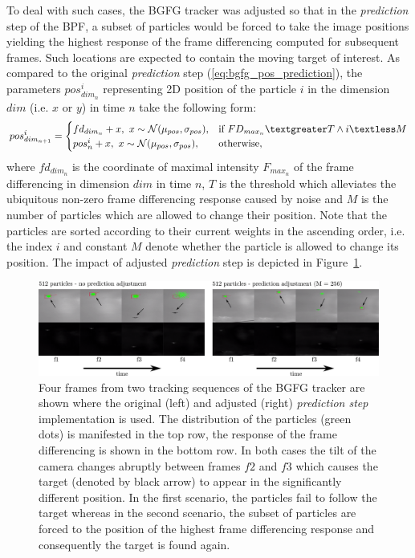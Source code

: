 To deal with such cases, the BGFG tracker was adjusted so that in the \textit{prediction} step of the BPF, a subset of particles would be forced to take the image positions yielding the highest response of the frame differencing computed for subsequent frames. Such locations are expected to contain the moving target of interest. As compared to the original \textit{prediction} step (\ref{eq:bgfg_pos_prediction}), the parameters $pos_{dim_{n}}^{i}$ representing 2D position of the particle $i$ in the dimension $dim$ (i.e. $x$ or $y$) in time $n$ take the following form:
\begin{align}
	pos_{dim_{n+1}}^{i} =
	\begin{cases}
		fd_{dim_{n}} + x, ~ x \sim \mathcal{N}(\mu_{pos}, \sigma_{pos}),  & \text{if}\ FD_{max_{n}} \textgreater T \land i \textless M \\
		pos_{n}^{i} + x, ~ x \sim \mathcal{N}(\mu_{pos}, \sigma_{pos}), & \text{otherwise},
	\end{cases}
\end{align}
where $fd_{dim_{n}}$ is the coordinate of maximal intensity $F_{max_{n}}$ of the frame differencing in dimension $dim$ in time $n$, $T$ is the threshold which alleviates the ubiquitous non-zero frame differencing response caused by noise and $M$ is the number of particles which are allowed to change their position. Note that the particles are sorted according to their current weights in the ascending order, i.e. the index $i$ and constant $M$ denote whether the particle is allowed to change its position. The impact of adjusted \textit{prediction} step is depicted in Figure~\ref{fig:frame_diff}. 

\begin{figure}[htb]
	\centering
	\includegraphics[width=0.99\linewidth]{fig/frame_diff.pdf}
	\caption{Four frames from two tracking sequences of the BGFG tracker are shown where the original (left) and adjusted (right) \textit{prediction step} implementation is used. The distribution of the particles (green dots) is manifested in the top row, the response of the frame differencing is shown in the bottom row. In both cases the tilt of the camera changes abruptly between frames $f 2$ and $f 3$ which causes the target (denoted by black arrow) to appear in the significantly different position. In the first scenario, the particles fail to follow the target whereas in the second scenario, the subset of particles are forced to the position of the highest frame differencing response and consequently the target is found again.}
	\label{fig:frame_diff}
\end{figure}

